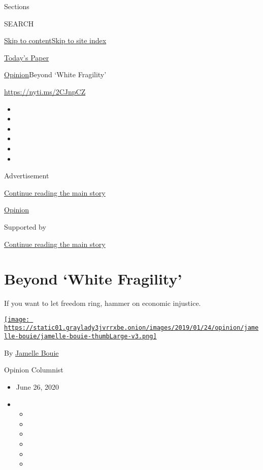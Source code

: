 Sections

SEARCH

\protect\hyperlink{site-content}{Skip to
content}\protect\hyperlink{site-index}{Skip to site index}

\href{https://myaccount.nytimes3xbfgragh.onion/auth/login?response_type=cookie\&client_id=vi}{}

\href{https://www.nytimes3xbfgragh.onion/section/todayspaper}{Today's
Paper}

\href{/section/opinion}{Opinion}\textbar{}Beyond `White Fragility'

\url{https://nyti.ms/2CJnpCZ}

\begin{itemize}
\item
\item
\item
\item
\item
\item
\end{itemize}

Advertisement

\protect\hyperlink{after-top}{Continue reading the main story}

\href{/section/opinion}{Opinion}

Supported by

\protect\hyperlink{after-sponsor}{Continue reading the main story}

\hypertarget{beyond-white-fragility}{%
\section{Beyond `White Fragility'}\label{beyond-white-fragility}}

If you want to let freedom ring, hammer on economic injustice.

\href{https://www.nytimes3xbfgragh.onion/column/jamelle-bouie}{\texttt{[image: https://static01.graylady3jvrrxbe.onion/images/2019/01/24/opinion/jamelle-bouie/jamelle-bouie-thumbLarge-v3.png]}}

By
\href{https://www.nytimes3xbfgragh.onion/column/jamelle-bouie}{Jamelle
Bouie}

Opinion Columnist

\begin{itemize}
\item
  June 26, 2020
\item
  \begin{itemize}
  \item
  \item
  \item
  \item
  \item
  \item
  \end{itemize}
\end{itemize}

